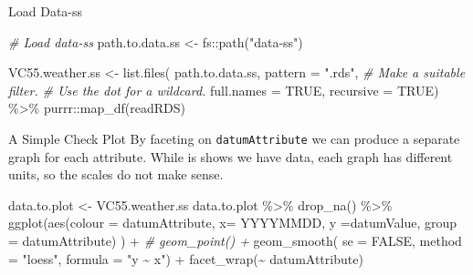 \documentclass[
  ignorenonframetext,
]{beamer}
\newenvironment{Shaded}{\begin{snugshade}}{\end{snugshade}}
\newcommand{\AttributeTok}[1]{\textcolor[rgb]{0.77,0.63,0.00}{#1}}
\newcommand{\CommentTok}[1]{\textcolor[rgb]{0.56,0.35,0.01}{\textit{#1}}}
\newcommand{\ConstantTok}[1]{\textcolor[rgb]{0.00,0.00,0.00}{#1}}
\newcommand{\FunctionTok}[1]{\textcolor[rgb]{0.00,0.00,0.00}{#1}}
\newcommand{\NormalTok}[1]{#1}
\newcommand{\OtherTok}[1]{\textcolor[rgb]{0.56,0.35,0.01}{#1}}
\newcommand{\SpecialCharTok}[1]{\textcolor[rgb]{0.00,0.00,0.00}{#1}}
\newcommand{\StringTok}[1]{\textcolor[rgb]{0.31,0.60,0.02}{#1}}
\begin{document}
\begin{frame}[fragile]{Load Data-ss}
\protect\hypertarget{load-data-ss}{}
\begin{Shaded}
\begin{Highlighting}[]
\CommentTok{\# Load data{-}ss}
\NormalTok{path.to.data.ss }\OtherTok{\textless{}{-}}\NormalTok{ fs}\SpecialCharTok{::}\FunctionTok{path}\NormalTok{(}\StringTok{"data{-}ss"}\NormalTok{)}

\NormalTok{VC55.weather.ss }\OtherTok{\textless{}{-}} \FunctionTok{list.files}\NormalTok{(}
\NormalTok{  path.to.data.ss,}
  \AttributeTok{pattern =} \StringTok{".rds"}\NormalTok{, }\CommentTok{\# Make a suitable filter. }
  \CommentTok{\# Use the dot for a wildcard.}
  \AttributeTok{full.names =} \ConstantTok{TRUE}\NormalTok{,}
  \AttributeTok{recursive =} \ConstantTok{TRUE}\NormalTok{)  }\SpecialCharTok{\%\textgreater{}\%}
\NormalTok{  purrr}\SpecialCharTok{::}\FunctionTok{map\_df}\NormalTok{(readRDS) }
\end{Highlighting}
\end{Shaded}
\end{frame}

\begin{frame}[fragile]{A Simple Check Plot}
\protect\hypertarget{a-simple-check-plot}{}
By faceting on \texttt{datumAttribute} we can produce a separate graph
for each attribute. While is shows we have data, each graph has
different units, so the scales do not make sense.

\begin{Shaded}
\begin{Highlighting}[]
\NormalTok{data.to.plot }\OtherTok{\textless{}{-}}\NormalTok{ VC55.weather.ss}
\NormalTok{data.to.plot }\SpecialCharTok{\%\textgreater{}\%} \FunctionTok{drop\_na}\NormalTok{() }\SpecialCharTok{\%\textgreater{}\%}
\FunctionTok{ggplot}\NormalTok{(}\FunctionTok{aes}\NormalTok{(}\AttributeTok{colour =}\NormalTok{ datumAttribute, }
           \AttributeTok{x=}\NormalTok{ YYYYMMDD, }
           \AttributeTok{y =}\NormalTok{datumValue, }
           \AttributeTok{group =}\NormalTok{ datumAttribute) ) }\SpecialCharTok{+} 
 \CommentTok{\# geom\_point() +}
  \FunctionTok{geom\_smooth}\NormalTok{( }\AttributeTok{se =} \ConstantTok{FALSE}\NormalTok{, }
     \AttributeTok{method =} \StringTok{"loess"}\NormalTok{, }\AttributeTok{formula =} \StringTok{"y \textasciitilde{} x"}\NormalTok{) }\SpecialCharTok{+}
  \FunctionTok{facet\_wrap}\NormalTok{(}\SpecialCharTok{\textasciitilde{}}\NormalTok{ datumAttribute)}
\end{Highlighting}
\end{Shaded}
\end{frame}
\end{document}
